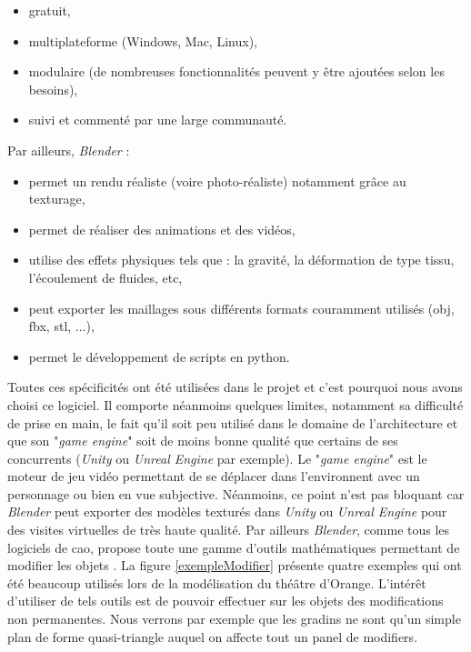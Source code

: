 \begin{itemize}
	\item gratuit,
	\item multiplateforme (Windows, Mac, Linux),
	\item modulaire (de nombreuses fonctionnalités peuvent y être ajoutées selon les besoins),
	\item suivi et commenté par une large communauté.
\end{itemize}
%
Par ailleurs, \textit{Blender} : 
\begin{itemize}
	\item permet un rendu réaliste (voire photo-réaliste) notamment grâce au texturage,
	\item permet de réaliser des animations et des vidéos,
	\item utilise des effets physiques tels que : la gravité, la déformation de type tissu, l'écoulement de fluides, etc,
	\item peut exporter les maillages sous différents formats couramment utilisés (obj, fbx, stl, ...),
	\item permet le développement de scripts en python.
\end{itemize}
%
Toutes ces spécificités ont été utilisées dans le projet et c'est pourquoi nous avons choisi ce logiciel. Il comporte néanmoins quelques limites, notamment sa difficulté de prise en main, le fait qu'il soit peu utilisé dans le domaine de l'architecture et que son "\textit{game engine}" soit de moins bonne qualité que certains de ses concurrents (\textit{Unity} ou \textit{Unreal Engine} par exemple). Le "\textit{game engine}" est le moteur de jeu vidéo permettant de se déplacer dans l'environnent avec un personnage ou bien en vue subjective. Néanmoins, ce point n'est pas bloquant car \textit{Blender} peut exporter des modèles texturés dans \textit{Unity} ou \textit{Unreal Engine} pour des visites virtuelles de très haute qualité. Par ailleurs \textit{Blender}, comme tous les logiciels de \gls{cao}, propose toute une gamme d'outils mathématiques permettant de modifier les objets \cite[Modificateurs]{doc_blender}. La figure \ref{exempleModifier} présente quatre exemples qui ont été beaucoup utilisés lors de la modélisation du théâtre d'Orange. L'intérêt d'utiliser de tels outils est de pouvoir effectuer sur les objets des modifications non permanentes. Nous verrons par exemple que les gradins ne sont qu'un simple plan de forme quasi-triangle auquel on affecte tout un panel de \glspl{modifier}.\\
%
